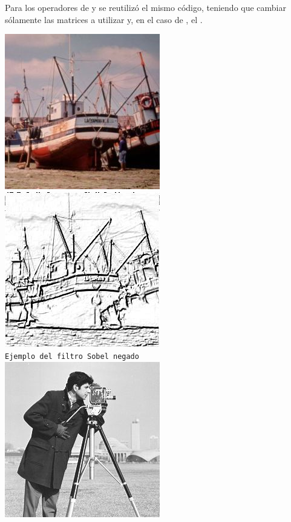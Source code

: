 Para los operadores de  y  se reutiliz\'o el mismo c\'odigo, teniendo que 
cambiar s\'olamente las matrices a utilizar y, en el caso de , el .\\
\vspace{1.0cm}
\begin{center}
\includegraphics[scale=0.5]{imgs/BoatsColor.jpg}
\includegraphics[scale=0.5]{imgs/BoatsColor-sobel-neg.jpg}\\
\texttt{\small Ejemplo del filtro Sobel negado}\\
\vspace{1.0cm}
\includegraphics[scale=0.5]{imgs/cameraman.jpg}

\end{center}
